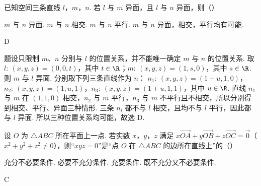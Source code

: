 \begin{problem}
已知空间三条直线 \(l\)，\(m\)，\(n\). 若 \(l\) 与 \(m\) 异面，且 \(l\) 与 \(n\) 异面，则（\quad）

\choices
    {\(m\) 与 \(n\) 异面.}
    {\(m\) 与 \(n\) 相交.}
    {\(m\) 与 \(n\) 平行.}
    {\(m\) 与 \(n\) 异面，相交，平行均有可能.}
\end{problem}

\begin{answer}
D
\end{answer}

\begin{solution}
题设只限制 \(m\)、\(n\) 分别与 \(l\) 的位置关系，并不能唯一确定 \(m\) 与 \(n\) 的位置关系. 取
\(l:\ (x,y,z)=(0,0,t)\)，其中 \(t\in\R\)；\(m:\ (x,y,z)=(1,s,0)\)，其中 \(s\in\R\).
则 \(m\) 与 \(l\) 异面. 分别取下列三条直线作为 \(n\)：
\(n_1:\ (x,y,z)=(1+u,1,0)\)，\(n_2:\ (x,y,z)=(1,u,1)\)，\(n_3:\ (x,y,z)=(1+u,1,1)\)，其中 \(u\in\R\).
直线 \(n_1\) 与 \(m\) 在 \((1,1,0)\) 相交，\(n_2\) 与 \(m\) 平行，\(n_3\) 与 \(m\) 不平行且不相交，所以分别得到相交、平行、异面三种情形. 三条 \(n_i\) 都不与 \(l\) 相交，且均不与 \(l\) 平行，因此都与 \(l\) 异面. 所以三种位置关系均可能，故选 D.
\end{solution}

\begin{problem}
设 \(O\) 为 \(\triangle ABC\) 所在平面上一点. 若实数 \(x\)，\(y\)，\(z\) 满足 \(x\overrightarrow{OA}+y\overrightarrow{OB}+z\overrightarrow{OC}=\overrightarrow{0}\)（\(x^2+y^2+z^2\ne0\)），则“\(xyz=0\)”是“点 \(O\) 在 \(\triangle ABC\) 的边所在直线上”的（\quad）

\choices
    {充分不必要条件.}
    {必要不充分条件.}
    {充要条件.}
    {既不充分又不必要条件.}
\end{problem}

\begin{answer}
C
\end{answer}

